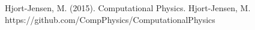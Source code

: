 \documentclass[twoside,twocolumn]{article}
\begin{document}

\begin{thebibliography}{99} %

Hjort-Jensen, M. (2015).
\newblock Computational Physics.
Hjort-Jensen, M.
\newblock https://github.com/CompPhysics/ComputationalPhysics

 
\end{thebibliography}

\end{document}
